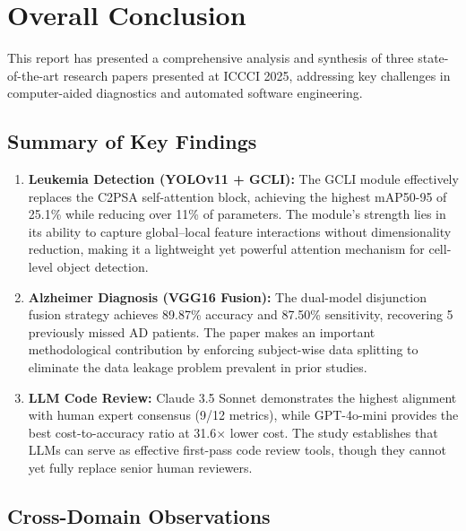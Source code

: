 
\section{Overall Conclusion}
\label{sec:conclusion}

This report has presented a comprehensive analysis and synthesis of three state-of-the-art research papers presented at ICCCI 2025, addressing key challenges in computer-aided diagnostics and automated software engineering.

\subsection{Summary of Key Findings}

\begin{enumerate}
    \item \textbf{Leukemia Detection (YOLOv11 + GCLI):} The GCLI module effectively replaces the C2PSA self-attention block, achieving the highest mAP50-95 of 25.1\% while reducing over 11\% of parameters. The module's strength lies in its ability to capture global--local feature interactions without dimensionality reduction, making it a lightweight yet powerful attention mechanism for cell-level object detection.

    \item \textbf{Alzheimer Diagnosis (VGG16 Fusion):} The dual-model disjunction fusion strategy achieves 89.87\% accuracy and 87.50\% sensitivity, recovering 5 previously missed AD patients. The paper makes an important methodological contribution by enforcing subject-wise data splitting to eliminate the data leakage problem prevalent in prior studies.

    \item \textbf{LLM Code Review:} Claude 3.5 Sonnet demonstrates the highest alignment with human expert consensus (9/12 metrics), while GPT-4o-mini provides the best cost-to-accuracy ratio at 31.6$\times$ lower cost. The study establishes that LLMs can serve as effective first-pass code review tools, though they cannot yet fully replace senior human reviewers.
\end{enumerate}

\subsection{Cross-Domain Observations}

